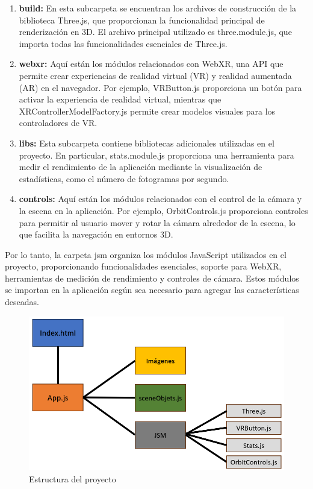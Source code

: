 \documentclass[a4paper, 12pt]{book}
\begin{document}
\begin{itemize}
  \begin{enumerate}
    \item \textbf{build:} En esta subcarpeta se encuentran los archivos de construcción de la biblioteca Three.js, 
    que proporcionan la funcionalidad principal de renderización en 3D. El archivo principal utilizado es three.module.js, 
    que importa todas las funcionalidades esenciales de Three.js.
    \item \textbf{webxr:} Aquí están los módulos relacionados con WebXR, una API que permite crear experiencias de realidad virtual (VR) y realidad aumentada (AR) en el navegador. 
    Por ejemplo, VRButton.js proporciona un botón para activar la experiencia de realidad virtual, mientras que XRControllerModelFactory.js 
    permite crear modelos visuales para los controladores de VR.
    \item \textbf{libs:} Esta subcarpeta contiene bibliotecas adicionales utilizadas en el proyecto. 
    En particular, stats.module.js proporciona una herramienta para medir el rendimiento de la aplicación 
    mediante la visualización de estadísticas, como el número de fotogramas por segundo.
    \item \textbf{controls:} Aquí están los módulos relacionados con el control de la cámara y la escena en la aplicación. 
    Por ejemplo, OrbitControls.js proporciona controles para permitir al usuario mover y rotar la cámara 
    alrededor de la escena, lo que facilita la navegación en entornos 3D.
  \end{enumerate}

  Por lo tanto, la carpeta jsm organiza los módulos JavaScript utilizados en el proyecto, 
  proporcionando funcionalidades esenciales, soporte para WebXR, herramientas de medición de rendimiento y controles de cámara. 
  Estos módulos se importan en la aplicación según sea necesario para agregar las características deseadas.

\end{itemize}

\begin{figure}
  \centering
  \includegraphics[width=12cm, keepaspectratio]{img/estructura.png}
  \caption{Estructura del proyecto}
  \label{fig:arquitectura}
\end{figure}
\end{document}
